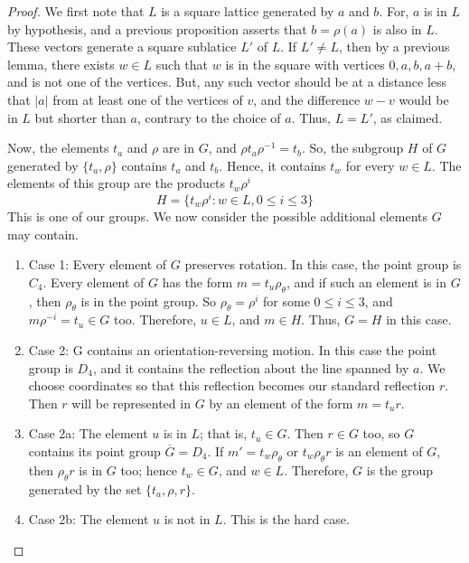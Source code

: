 \documentclass[12pt]{article}
\theoremstyle{definition}
\theoremstyle{remark}
\numberwithin{equation}{section}
\begin{document}
\begin{proof}
        We first note that $L$ is a square lattice generated by $a$ and $b$. For, $a$ is in $L$ by hypothesis, and a previous proposition asserts that $b = \rho(a)$ is also in $L$. These vectors generate a square sublatice $L'$ of $L$. If $L' \neq L$, then by a previous lemma, there exists $w \in L$ such that $w$ is in the square with vertices $0,a,b,a+b$, and is not one of the vertices. But, any such vector should be at a distance less that $|a|$ from at least one of the vertices of $v$, and the difference $w-v$ would be in $L$ but shorter than $a$, contrary to the choice of $a$. Thus, $L = L'$, as claimed. 


        Now, the elements $t_a$ and $\rho$ are in $G$, and $\rho t_a\rho^{-1} = t_b$. So, the subgroup $H$ of $G$ generated by $\{t_a,\rho\}$ contains $t_a$ and $t_b$. Hence, it contains $t_w$ for every $w \in L$. The elements of this group are the products $t_w\rho^i$ \begin{equation}
                H=\{ t_w\rho^i:w\in L,0\leq i \leq 3\}
        \end{equation}
        This is one of our groups. We now consider the possible additional elements $G$ may contain.


        \begin{enumerate}
                \item[] Case 1: Every element of $G$ preserves rotation. In this case, the point group is $C_4$. Every element of $G$ has the form $m = t_u\rho_{\theta}$, and if such an element is in $G$, then $\rho_{\theta}$ is in the point group. So $\rho_{\theta} = \rho^i$ for some $0\leq i \leq 3$, and $m\rho^{-i} = t_u \in G$ too. Therefore, $u \in L$, and $m \in H$. Thus, $G = H$ in this case.
                \item[] Case 2: G contains an orientation-reversing motion. In this case the point group is $D_4$, and it contains the reflection about the line spanned by $a$. We choose coordinates so that this reflection becomes our standard reflection $r$. Then $r$ will be represented in $G$ by an element of the form $m =t_ur$.
                \item[] Case 2a: The element $u$ is in $L$; that is, $t_u \in G$. Then $r \in G$ too, so $G$ contains its point group $\overline{G} = D_4$. If $m' =t_w\rho_{\theta}$ or $t_w\rho_{\theta}r$ is an element of $G$, then $\rho_{\theta}r$ is in $G$ too; hence $t_w \in G$, and $w \in L$. Therefore, $G$ is the group generated by the set $\{t_a,\rho,r\}$.
                \item[] Case 2b: The element $u$ is not in $L$. This is the hard case.


\end{enumerate}
\end{proof}
\end{document}
